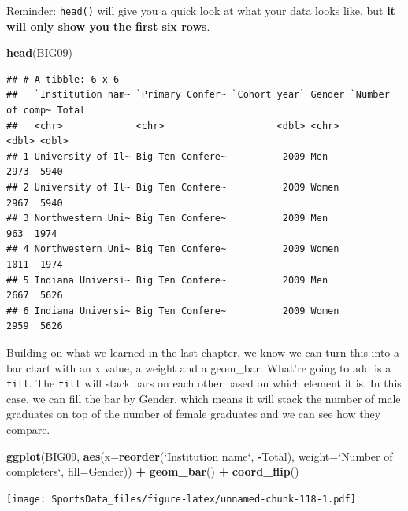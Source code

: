 \documentclass[]{book}
\newenvironment{Shaded}{\begin{snugshade}}{\end{snugshade}}
\newcommand{\DataTypeTok}[1]{\textcolor[rgb]{0.13,0.29,0.53}{#1}}
\newcommand{\KeywordTok}[1]{\textcolor[rgb]{0.13,0.29,0.53}{\textbf{#1}}}
\newcommand{\NormalTok}[1]{#1}
\newcommand{\OperatorTok}[1]{\textcolor[rgb]{0.81,0.36,0.00}{\textbf{#1}}}
\newcommand{\StringTok}[1]{\textcolor[rgb]{0.31,0.60,0.02}{#1}}
\begin{document}
Reminder: \texttt{head()} will give you a quick look at what your data looks like, but \textbf{it will only show you the first six rows}.

\begin{Shaded}
\begin{Highlighting}[]
\KeywordTok{head}\NormalTok{(BIG09)}
\end{Highlighting}
\end{Shaded}

\begin{verbatim}
## # A tibble: 6 x 6
##   `Institution nam~ `Primary Confer~ `Cohort year` Gender `Number of comp~ Total
##   <chr>             <chr>                    <dbl> <chr>             <dbl> <dbl>
## 1 University of Il~ Big Ten Confere~          2009 Men                2973  5940
## 2 University of Il~ Big Ten Confere~          2009 Women              2967  5940
## 3 Northwestern Uni~ Big Ten Confere~          2009 Men                 963  1974
## 4 Northwestern Uni~ Big Ten Confere~          2009 Women              1011  1974
## 5 Indiana Universi~ Big Ten Confere~          2009 Men                2667  5626
## 6 Indiana Universi~ Big Ten Confere~          2009 Women              2959  5626
\end{verbatim}

Building on what we learned in the last chapter, we know we can turn this into a bar chart with an x value, a weight and a geom\_bar. What're going to add is a \texttt{fill}. The \texttt{fill} will stack bars on each other based on which element it is. In this case, we can fill the bar by Gender, which means it will stack the number of male graduates on top of the number of female graduates and we can see how they compare.

\begin{Shaded}
\begin{Highlighting}[]
\KeywordTok{ggplot}\NormalTok{(BIG09, }\KeywordTok{aes}\NormalTok{(}\DataTypeTok{x=}\KeywordTok{reorder}\NormalTok{(}\StringTok{`}\DataTypeTok{Institution name}\StringTok{`}\NormalTok{, }\OperatorTok{-}\NormalTok{Total), }\DataTypeTok{weight=}\StringTok{`}\DataTypeTok{Number of completers}\StringTok{`}\NormalTok{, }\DataTypeTok{fill=}\NormalTok{Gender)) }\OperatorTok{+}\StringTok{ }\KeywordTok{geom_bar}\NormalTok{() }\OperatorTok{+}\StringTok{ }\KeywordTok{coord_flip}\NormalTok{()}
\end{Highlighting}
\end{Shaded}

\texttt{[image: SportsData\_files/figure-latex/unnamed-chunk-118-1.pdf]}
\end{document}
